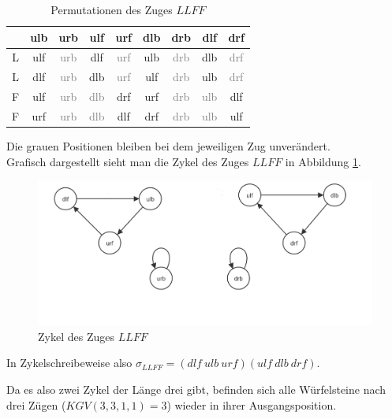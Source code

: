 \documentclass[12pt,a4paper, usenames, dvipsnames]{article}
\begin{document}
\begin{table}[H]
\centering
\begin{tabular}{|c||c|c|c|c|c|c|c|c|}
\hline
 & ulb & urb & ulf & urf & dlb & drb & dlf & drf \\
\hline
\hline
L & ulf & \textcolor{gray}{urb} & dlf & \textcolor{gray}{urf} & ulb & \textcolor{gray}{drb} & dlb & \textcolor{gray}{drf} \\
\hline
L & dlf & \textcolor{gray}{urb} & dlb & \textcolor{gray}{urf} & ulf & \textcolor{gray}{drb} & ulb & \textcolor{gray}{drf} \\
\hline
F & ulf & \textcolor{gray}{urb} & \textcolor{gray}{dlb} & drf & urf & \textcolor{gray}{drb} & \textcolor{gray}{ulb} & dlf \\
\hline
F & urf & \textcolor{gray}{urb} & \textcolor{gray}{dlb} & dlf & drf & \textcolor{gray}{drb} & \textcolor{gray}{ulb} & ulf \\
\hline

\end{tabular}
\caption[Permutationen des Zuges $LLFF$]{Permutationen des Zuges $LLFF$}
\end{table}

Die grauen Positionen bleiben bei dem jeweiligen Zug unverändert. \\

Grafisch dargestellt sieht man die Zykel des Zuges $LLFF$ in Abbildung \ref{17}. 


\begin{figure}[h]
\includegraphics[scale=0.3]{zykel_LLFF.png}
\caption[Zykel des Zuges $LLFF$]{Zykel des Zuges $LLFF$}
\label{17}
\end{figure}

In Zykelschreibeweise also $\sigma_{LLFF}=(dlf \ ulb \ urf)(ulf \ dlb \ drf)$.

Da es also zwei Zykel der Länge drei gibt, befinden sich alle Würfelsteine nach drei Zügen ($KGV(3,3,1,1)=3$) wieder in ihrer Ausgangsposition. 
\end{document}
